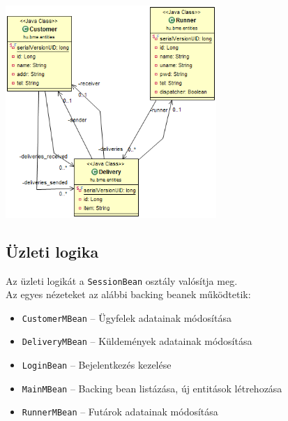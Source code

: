 \documentclass[a4paper,oneside,12pt]{article}
\begin{document}
\begin{center}
        \includegraphics[width=8cm]{entities.PNG}
        \label{fig:entities}
\end{center}

\subsection{Üzleti logika}
Az üzleti logikát a \verb+SessionBean+ osztály valósítja meg.
\\Az egyes nézeteket az alábbi backing beanek működtetik:
\begin{itemize}
\item \verb+CustomerMBean+ -- Ügyfelek adatainak módosítása
\item \verb+DeliveryMBean+ -- Küldemények adatainak módosítása
\item \verb+LoginBean+ -- Bejelentkezés kezelése 
\item \verb+MainMBean+  -- Backing bean listázása, új entitások létrehozása
\item \verb+RunnerMBean+ -- Futárok adatainak módosítása
\end{itemize}
\end{document}
